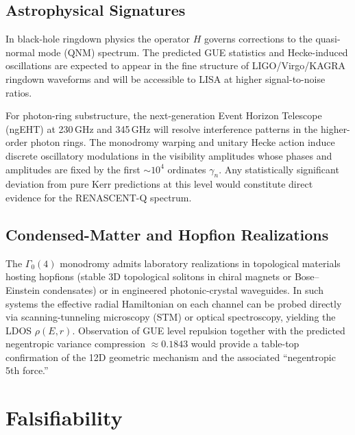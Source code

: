 \documentclass[11pt,a4paper]{article}
\begin{document}
\subsection{Astrophysical Signatures}

In black-hole ringdown physics the operator \(H\) governs corrections to the quasi-normal mode (QNM) spectrum. The predicted GUE statistics and Hecke-induced oscillations are expected to appear in the fine structure of LIGO/Virgo/KAGRA ringdown waveforms and will be accessible to LISA at higher signal-to-noise ratios.

For photon-ring substructure, the next-generation Event Horizon Telescope (ngEHT) at 230\,GHz and 345\,GHz will resolve interference patterns in the higher-order photon rings. The monodromy warping and unitary Hecke action induce discrete oscillatory modulations in the visibility amplitudes whose phases and amplitudes are fixed by the first \(\sim 10^4\) ordinates \(\gamma_n\). Any statistically significant deviation from pure Kerr predictions at this level would constitute direct evidence for the RENASCENT-Q spectrum.

\subsection{Condensed-Matter and Hopfion Realizations}

The \(\Gamma_0(4)\) monodromy admits laboratory realizations in topological materials hosting hopfions (stable 3D topological solitons in chiral magnets or Bose–Einstein condensates) or in engineered photonic-crystal waveguides. In such systems the effective radial Hamiltonian on each channel can be probed directly via scanning-tunneling microscopy (STM) or optical spectroscopy, yielding the LDOS \(\rho(E,r)\). Observation of GUE level repulsion together with the predicted negentropic variance compression \(\approx 0.1843\) would provide a table-top confirmation of the 12D geometric mechanism and the associated “negentropic 5th force.”

\section{Falsifiability}
\end{document}
